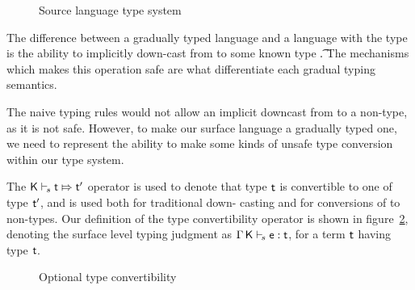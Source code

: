 \documentclass[runnningheads]{tex/llncs}
\begin{document}
\begin{figure}[hb]
\begin{mathpar}
          \end{mathpar}
  
  \vspace{2mm}
  
  \hrulefill
  \caption{Source language type system}\label{fig:slts}
\end{figure}

The difference between a gradually typed language and a
language with the \any type is the ability to implicitly down-cast
from \any to some known type \t. The mechanisms which makes this operation
safe are what differentiate each gradual typing semantics.

The naive typing rules would not allow an implicit downcast from \any to a
non-\any type, as it is not safe. However, to make our surface
language a gradually typed one, we need to represent the ability to make some
kinds of unsafe type conversion within our type system.

The $\ConvertE\K{s}{\t}{\tp}$ operator is used to denote that type $\t$ is
convertible to one of type $\tp$, and is used both for traditional down-
casting and for conversions of \any to non-\any types. Our definition of the
type convertibility operator is shown in figure~\ref{fig:tyconvert}, denoting
the surface level typing judgment as $\EnvTypeS\Env\K\e\t$, for a term $\t$
having type $\t$.

\begin{figure}[hb]
  \hrulefill  \small  \vspace{-3mm}
  
  \begin{mathpar}
    
    
  \end{mathpar}
  \vspace{-8mm}
  
  \hrulefill
  \caption{Optional type convertibility}
\label{fig:tyconvert}
\end{figure}
\end{document}
